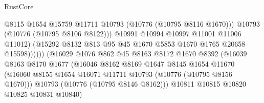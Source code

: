 \begin{lexlean}{RustCore}
\begin{coremodule}
                                            @8115
                                            @1654
                                            @15759
                                            @11711
                                            @10793
                                            (@10776 (@10795 @8116 @1670)))
                                          @10793
                                          (@10776 (@10795 @8106 @8122)))
                                        @10991
                                        @10994
                                        @10997
                                        @11001
                                        @11006
                                        @11012)
                                      (@15292
                                        @8132
                                        @813
                                        @95
                                        @45
                                        @1670
                                        @5853
                                        @1670
                                        @1765
                                        @20658
                                        @15598))))))
                            (@16029
                              @1076
                              @862
                              @45
                              @8163
                              @8172
                              @1670
                              @8392
                              (@16039
                                @8163
                                @8170
                                @1677
                                (@16046
                                  @8162
                                  @8169
                                  @1647
                                  @8145
                                  @1654
                                  @11670
                                  (@16060
                                    @8155
                                    @1654
                                    @16071
                                    @11711
                                    @10793
                                    (@10776 (@10795 @8156 @1670)))
                                  @10793
                                  (@10776 (@10795 @8146 @8162)))
                                @10811
                                @10815
                                @10820
                                @10825
                                @10831
                                @10840)

\end{coremodule}
\end{lexlean}
